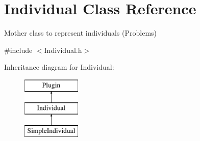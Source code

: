 \hypertarget{classIndividual}{}\section{Individual Class Reference}
\label{classIndividual}


Mother class to represent individuals (Problems)  




{\ttfamily \#include $<$Individual.\+h$>$}

Inheritance diagram for Individual\+:\begin{figure}[H]
\begin{center}
\leavevmode
\includegraphics[height=3.000000cm]{d6/d0c/classIndividual}
\end{center}
\end{figure}
